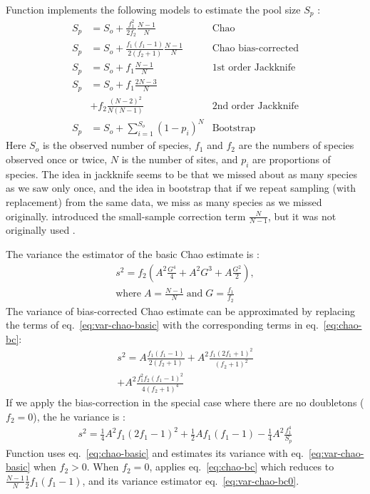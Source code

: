 \documentclass[a4paper,10pt,twocolumn]{article}
\begin{document}
Function  implements the following models to estimate
the pool size $S_p$ \citep{SmithVanBelle84, Chao87, ChiuEtal14}:
\begin{align}
\label{eq:chao-basic}
S_p &= S_o + \frac{f_1^2}{2 f_2} \frac{N-1}{N} & \text{Chao}\\
\label{eq:chao-bc}
S_p &= S_o + \frac{f_1 (f_1 -1)}{2 (f_2+1)}  \frac{N-1}{N} & \text{Chao bias-corrected}\\
S_p &= S_o + f_1 \frac{N-1}{N}  & \text{1st order Jackknife}\\
S_p & = S_o + f_1 \frac{2N-3}{N} \nonumber \\ & + f_2 \frac{(N-2)^2}{N(N-1)}
& \text{2nd order Jackknife}\\
S_p &= S_o + \sum_{i=1}^{S_o} (1-p_i)^N & \text{Bootstrap}
\end{align}
Here $S_o$ is the observed number of species, $f_1$ and $f_2$ are the
numbers of species observed once or twice, $N$ is the number of sites,
and $p_i$ are proportions of species.  The idea in jackknife seems to
be that we missed about as many species as we saw only once, and the
idea in bootstrap that if we repeat sampling (with replacement) from
the same data, we miss as many species as we missed originally.
\citet{ChiuEtal14} introduced the small-sample correction term
$\frac{N}{N-1}$, but it was not originally used \citep{Chao87}.

The variance the estimator of the basic Chao estimate is \citep{ChiuEtal14}:
\begin{multline}
\label{eq:var-chao-basic}
s^2 = f_2 \left(A^2 \frac{G^4}{4} + A^2 G^3 + A \frac{G^2}{2} \right),\\
\text{where}\; A = \frac{N-1}{N}\;\text{and}\; G = \frac{f_1}{f_2} 
\end{multline}
The variance of bias-corrected Chao estimate can be approximated by
replacing the terms of eq.~\ref{eq:var-chao-basic} with the
corresponding terms in eq.~\ref{eq:chao-bc}:
\begin{multline}
\label{eq:var-chao-bc}
s^2 = A \frac{f_1(f_1-1)}{2(f_2+1)} + A^2 \frac{f_1(2 f_1+1)^2}{(f_2+1)^2}\\
 + A^2 \frac{f_1^2 f_2 (f_1 -1)^2}{4 (f_2 + 1)^4}
\end{multline}
If we apply the bias-correction in the special case where there are no
doubletons ($f_2 = 0$), the he variance is 
\citep[who omit small-sample correction in some terms]{ChiuEtal14}:
\begin{multline}
\label{eq:var-chao-bc0}
s^2 = \frac{1}{4} A^2 f_1 (2f_1 -1)^2 + \frac{1}{2} A f_1 (f_1-1) - \frac{1}{4}A^2 \frac{f_1^4}{S_p}
\end{multline}
Function  uses eq.~\ref{eq:chao-basic} and estimates
its variance with eq.~\ref{eq:var-chao-basic} when $f_2 > 0$. When
$f_2 = 0$,  applies eq.~\ref{eq:chao-bc} which reduces
to $\frac{N-1}{N} \frac{1}{2} f_1 (f_1 - 1)$, and its variance
estimator eq.~\ref{eq:var-chao-bc0}.
\end{document}
